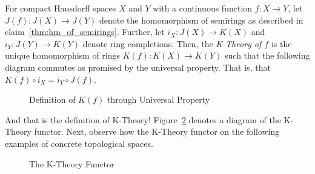 \documentclass[../sean_thesis.tex]{subfiles}
\begin{document}
\begin{definition}
\label{def:k_theory_obj}
	For compact Hausdorff spaces $X$ and $Y$ with a continuous function $f: X \to Y$, let $J(f): J(X) \to J(Y)$ denote the homomorphism of semirings as described in claim~\ref{thm:hm_of_semirings}. Further, let $i_X: J(X) \to K(X)$ and $i_Y: J(Y) \to K(Y)$ denote ring completions. Then, the \emph{K-Theory of $f$} is the unique homomorphism of rings $K(f): K(X) \to K(Y)$ such that the following diagram commutes as promised by the universal property. That is, that $K(f) \circ i_X = i_Y \circ J(f)$.
	
\begin{figure}[ht!]
	
	\caption{Definition of $K(f)$ through Universal Property}
	\label{fig:ktheory_univ_property}
\end{figure}
\end{definition}

And that is the definition of K-Theory! Figure~\ref{fig:ktheory_functor} denotes a diagram of the K-Theory functor. Next, observe how the K-Theory functor on the following examples of concrete topological spaces.

\begin{figure}

\caption{The K-Theory Functor}
\label{fig:ktheory_functor}
\end{figure}
\end{document}
